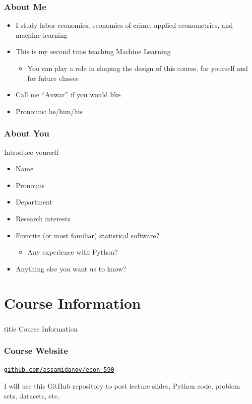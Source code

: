 \documentclass{beamer}
\begin{document}
\begin{frame}\frametitle{About Me}
    \begin{itemize}
        \item I study labor economics, economics of crime, applied econometrics, and machine learning
        \item This is my second time teaching Machine Learning
        \begin{itemize}
            \item You can play a role in shaping the design of this course, for yourself and for future classes
        \end{itemize}
        \item Call me ``Anwar'' if you would like
        \item Pronouns: he/him/his
    \end{itemize}
\end{frame}

\begin{frame}\frametitle{About You}
    Introduce yourself
    \begin{itemize}
        \item Name
        \item Pronouns
        \item Department
        \item Research interests
        \item Favorite (or most familiar) statistical software? 
        \begin{itemize}
            \item Any experience with Python?
        \end{itemize}
        \item Anything else you want us to know?
    \end{itemize}
\end{frame}

\section{Course Information}
\label{information}
\begin{frame}\frametitle{}
    \vfill
    \centering
    \begin{beamercolorbox}[center]{title}
        \Large Course Information
    \end{beamercolorbox}
    \vfill
\end{frame}

\begin{frame}\frametitle{Course Website}
    \begin{center}
    	\href{https://github.com/assamidanov/econ_590}{\texttt{github.com/assamidanov/econ{\_}590}}
    \end{center}
    \vspace{3ex}
    I will use this GitHub repository to post lecture slides, Python code, problem sets, datasets, etc.
\end{frame}
\end{document}
